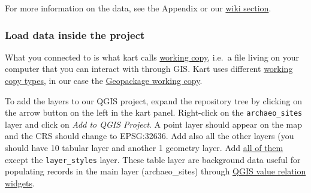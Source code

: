 \documentclass[
  letterpaper,
  DIV=11,
  numbers=noendperiod]{scrartcl}
\begin{document}
\begin{tcolorbox}[enhanced jigsaw, leftrule=.75mm, left=2mm, coltitle=black, opacityback=0, breakable, bottomrule=.15mm, title={Tip}, rightrule=.15mm, arc=.35mm, colback=white, colbacktitle=quarto-callout-tip-color!10!white, toprule=.15mm, bottomtitle=1mm, toptitle=1mm, titlerule=0mm, opacitybacktitle=0.6, colframe=quarto-callout-tip-color-frame]

For more information on the data, see the Appendix or our
\href{https://github.com/UnitoAssyrianGovernance/.github/wiki/GIS-Vector-Data\#main-layer-table-structure}{wiki
section}.

\end{tcolorbox}

\subsubsection{Load data inside the
project}\label{load-data-inside-the-project}

What you connected to is what kart calls
\href{https://docs.kartproject.org/en/latest/pages/quick_guide.html\#workflow}{working
copy}, i.e.~a file living on your computer that you can interact with
through GIS. Kart uses different
\href{https://docs.kartproject.org/en/latest/pages/wc_types.html}{working
copy types}, in our case the
\href{https://docs.kartproject.org/en/latest/pages/wc_types/gpkg_wc.html}{Geopackage
working copy}.

To add the layers to our QGIS project, expand the repository tree by
clicking on the arrow button on the left in the kart panel. Right-click
on the \texttt{archaeo\_sites} layer and click on \emph{Add to QGIS
Project}. A point layer should appear on the map and the CRS should
change to EPSG:32636. Add also all the other layers (you should have 10
tabular layer and another 1 geometry layer. Add \ul{all of them} except
the \texttt{layer\_styles} layer. These table layer are background data
useful for populating records in the main layer (archaeo\_sites) through
\href{https://docs.qgis.org/3.34/en/docs/user_manual/working_with_vector/vector_properties.html\#edit-widgets}{QGIS
value relation widgets}.
\end{document}
